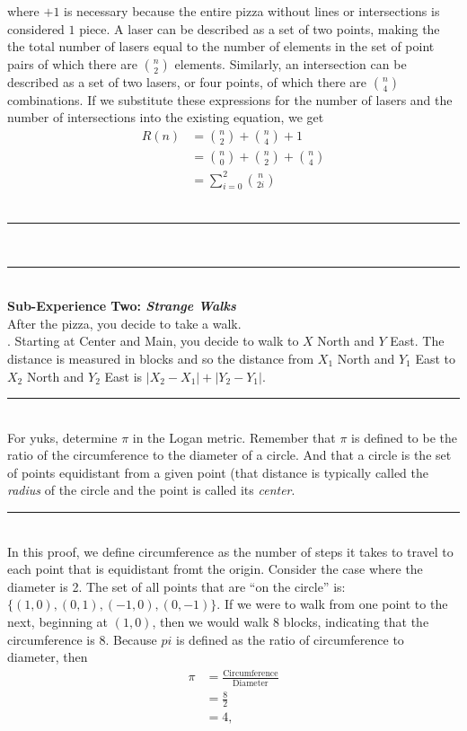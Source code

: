 \documentclass{article}
\newcommand{\problemsep}{\leavevmode\\[0.05in] \rule[\baselineskip/4]{\textwidth}{1pt} \\[0.005in] \rule[\baselineskip]{\textwidth}{1pt}\vspace{-\baselineskip/2}\leavevmode\\[0.05in]}
\newcommand{\statementsep}{\leavevmode\\[0.005in] \rule[\baselineskip/4]{\textwidth}{0.4pt}\leavevmode\\[0.005in]}
\begin{document}
where $+ 1$ is necessary because the entire pizza without lines or intersections is considered $1$ piece. A laser can be described as a set of two points, making the the total number of lasers equal to the number of elements in the set of point pairs of which there are $n \choose 2$ elements. Similarly, an intersection can be described as a set of two lasers, or four points, of which there are $n \choose 4$ combinations.  If we substitute these expressions for the number of lasers and the number of intersections into the existing equation, we get
\begin{equation*} \begin{aligned}
R(n) &= {n \choose 2} + {n \choose 4} + 1 \\
	 &= {n \choose 0} + {n \choose 2} + {n \choose 4} \\
     &= \sum_{i=0}^2 {n \choose 2i}
\end{aligned}\end{equation*}
\problemsep
\noindent \maltese \hspace{1ex} {\bf Sub-Experience Two: \emph{Strange Walks}}\\
After the pizza, you decide to take a walk.\\
.
Starting at Center and Main, you decide to walk to $X$ North and $Y$ East.
The distance is measured in blocks and so the distance from $X_1$ North and $Y_1$ 
East to $X_2$ North and $Y_2$ East is $|X_2 - X_1| + |Y_2 - Y_1|$.
\statementsep
{} For yuks, determine $\pi$ in the Logan metric.
Remember that $\pi$ is defined to be the ratio of the circumference to the diameter
of a circle.
And that a circle is the set of points equidistant from a given point (that 
distance is typically called the \emph{radius} of the circle and the point is 
called its \emph{center}.
\statementsep
In this proof, we define circumference as the number of steps it takes to travel to each point that is equidistant fromt the origin. Consider the case where the diameter is 2. The set of all points that are ``on the circle'' is: $\{(1,0), (0,1), (-1, 0), (0, -1) \}$. If we were to walk from one point to the next, beginning at $(1,0)$, then we would walk $8$ blocks, indicating that the circumference is $8$. Because $pi$ is defined as the ratio of circumference to diameter, then 
\begin{equation*}\begin{aligned}
\pi &= \frac{\text{Circumference}}{\text{Diameter}} \\
    &= \frac{8}{2} \\
	&= 4,
\end{aligned}\end{equation*}
\end{document}
